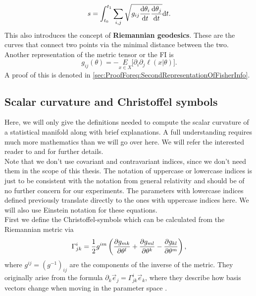 \begin{equation}
	s = \int_{t_0}^{t_1} \sum_{i,j} \sqrt{g_{ij}\frac{\mathrm{d}\theta_i}{\mathrm{d}t}\frac{\mathrm{d}\theta_j}{\mathrm{d}t}} \mathrm{d}t. 
\end{equation}
This also introduces the concept of \textbf{Riemannian geodesics}. These are the curves that connect two points via the minimal distance between the two.\\
Another representation of the metric tensor or the FI is \cite{AmarisLectureNotes} 
\begin{equation}\label{eq:SecondRepresentationOfFisherInfo}
	g_{ij}(\theta) = - \underset{x\in X}{E} \Big[ \partial_i \partial_j \ell(x|\theta) \Big].
\end{equation}
A proof of this is denoted in \cref{sec:ProofForeq:SecondRepresentationOfFisherInfo}.

\subsection{Scalar curvature and Christoffel symbols}\label{sec:Curvature}
Here, we will only give the definitions needed to compute the scalar curvature of a statistical manifold along with brief explanations. A full understanding requires much more mathematics than we will go over here. We will refer the interested reader to \cite{AmarisLectureNotes} and \cite{GeneralRelativityBook} for further details.\\
Note that we don't use covariant and contravariant indices, since we don't need them in the scope of this thesis. The notation of uppercase or lowercase indices is just to be consistent with the notation from general relativity and should be of no further concern for our experiments. The parameters with lowercase indices defined previously translate directly to the ones with uppercase indices here. We will also use Einstein notation for these equations.\\
First we define the Christoffel-symbols which can be calculated from the Riemannian metric via \cite{GeneralRelativityBook}
\begin{equation}
	\Gamma^{i}_{jk} = \frac{1}{2}g^{im} \left(\frac{\partial g_{mk}}{\partial\theta^l} + \frac{\partial g_{ml}}{\partial\theta^k} - \frac{\partial g_{kl}}{\partial\theta^m}\right),
\end{equation} 
where $g^{ij} = (g^{-1})_{ij}$ are the components of the inverse of the metric. They originally arise from the formula $\partial_k \vec{e}_j = \Gamma^i_{jk} \vec{e}_k$, where they describe how basis vectors change when moving in the parameter space \cite{GeneralRelativityBook}.
